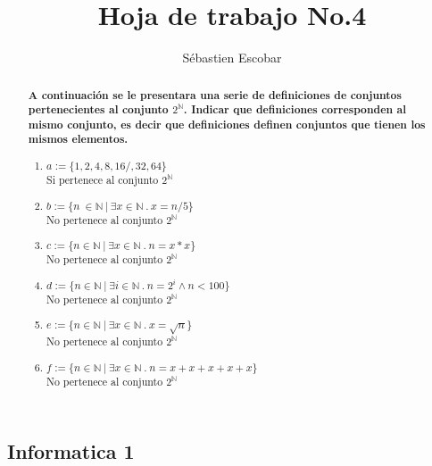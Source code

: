 \documentclass[12pt,letterpaper,twocolumn]{article}
\begin{document}
\title{Hoja de trabajo No.4}
\author{Sébastien Escobar}
\maketitle

\subsection*{Informatica 1}
\renewcommand{\abstractname}{Ejercicio No.1 }
\begin{abstract}
\textbf{A continuaci\'on se le presentara una serie de definiciones de conjuntos pertenecientes al
conjunto $2^{\mathbb{N}}$. Indicar que definiciones corresponden al mismo conjunto, es decir
que definiciones definen conjuntos que tienen los mismos elementos.}
\\
\begin{enumerate}
        \item{$a:=\{1,2,4,8,16/,32,64\}$} 
        \\Si pertenece al conjunto  $2^{\mathbb{N}}$
        \item{$b:=\{n\ \in \mathbb{N}\ |\ \exists x \in \mathbb{N}\ .\ x=n/5 \}$}
        \\ No pertenece al conjunto  $2^{\mathbb{N}}$
        \item{$c:=\{n\in \mathbb{N}\ |\ \exists x\in\mathbb{N}\ .\ n=x*x \}$} 
        \\No pertenece al conjunto  $2^{\mathbb{N}}$
        \item{$d:=\{n\in\mathbb{N}\ |\ \exists i\in\mathbb{N}\ .\ n=2^i\wedge n<100 \}$} 
        \\No pertenece al conjunto  $2^{\mathbb{N}}$
        \item{$e:=\{ n\in\mathbb{N}\ |\ \exists x\in \mathbb{N}\ .\ x=\sqrt{n} \}$} 
        \\No pertenece al conjunto  $2^{\mathbb{N}}$
        \item{$f:=\{ n\in\mathbb{N}\ |\ \exists x\in \mathbb{N}\ .\ n=x+x+x+x+x \}$} 
        \\No pertenece al conjunto  $2^{\mathbb{N}}$
\end{enumerate}

\end{abstract}
\end{document}
